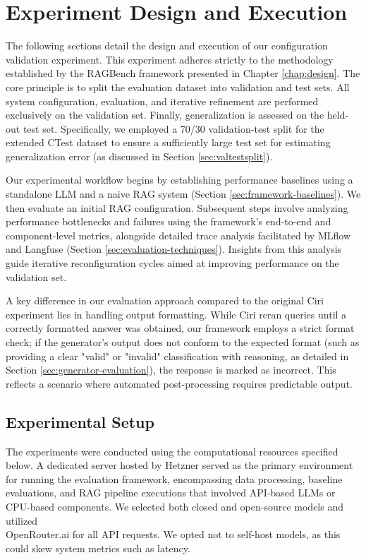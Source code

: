 \section{Experiment Design and Execution} \label{sec:exp_design_exec}
The following sections detail the design and execution of our configuration validation experiment. This experiment adheres strictly to the methodology established by the RAGBench framework presented in Chapter \ref{chap:design}. The core principle is to split the evaluation dataset into validation and test sets. All system configuration, evaluation, and iterative refinement are performed exclusively on the validation set. Finally, generalization is assessed on the held-out test set. Specifically, we employed a 70/30 validation-test split for the extended CTest dataset to ensure a sufficiently large test set for estimating generalization error (as discussed in Section \ref{sec:valtestsplit}).

Our experimental workflow begins by establishing performance baselines using a standalone LLM and a naive RAG system (Section \ref{sec:framework-baselines}). We then evaluate an initial RAG configuration. Subsequent steps involve analyzing performance bottlenecks and failures using the framework's end-to-end and component-level metrics, alongside detailed trace analysis facilitated by MLflow and Langfuse (Section \ref{sec:evaluation-techniques}). Insights from this analysis guide iterative reconfiguration cycles aimed at improving performance on the validation set.

A key difference in our evaluation approach compared to the original Ciri experiment \cite{Lian.2024} lies in handling output formatting. While Ciri reran queries until a correctly formatted answer was obtained, our framework employs a strict format check; if the generator's output does not conform to the expected format (such as providing a clear "valid" or "invalid" classification with reasoning, as detailed in Section \ref{sec:generator-evaluation}), the response is marked as incorrect. This reflects a scenario where automated post-processing requires predictable output.


\subsection{Experimental Setup} \label{sec:exp_setup}
The experiments were conducted using the computational resources specified below. A dedicated server hosted by Hetzner served as the primary environment for running the evaluation framework, encompassing data processing, baseline evaluations, and RAG pipeline executions that involved API-based LLMs or CPU-based components. We selected both closed and open-source models and utilized \\OpenRouter.ai \cite{openrouter-inc-2023} for all API requests. We opted not to self-host models, as this could skew system metrics such as latency.

